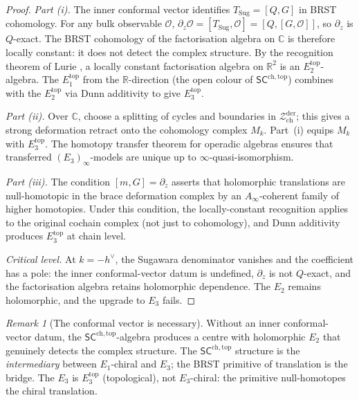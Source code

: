 \documentclass[11pt,reqno]{amsart}
\theoremstyle{definition}
\theoremstyle{remark}
\newtheorem{remark}[theorem]{Remark}
\providecommand{\cO}{\mathcal{O}}
\providecommand{\cZ}{\mathcal{Z}}
\providecommand{\Ainf}{A_\infty}
\providecommand{\Eone}{E_1}
\providecommand{\Etwo}{E_2}
\providecommand{\Ethree}{E_3}
\providecommand{\SCchtop}{\ensuremath{\mathsf{SC}^{\mathrm{ch,top}}}}
\providecommand{\bC}{\mathbb{C}}
\providecommand{\bR}{\mathbb{R}}
\begin{document}
\begin{proof}
\emph{Part (i).}
The inner conformal vector identifies $T_{\mathrm{Sug}} =
[Q, G]$ in BRST cohomology. For any bulk observable $\cO$,
$\partial_z\cO = [T_{\mathrm{Sug}}, \cO] = [Q, [G, \cO]]$,
so $\partial_z$ is $Q$-exact. The BRST cohomology of the
factorisation algebra on $\bC$ is therefore locally constant:
it does not detect the complex structure. By the recognition
theorem of Lurie \cite{HA}, a locally constant factorisation
algebra on $\bR^2$ is an $\Etwo^{\mathrm{top}}$-algebra.
The $\Eone^{\mathrm{top}}$ from the $\bR$-direction (the open
colour of $\SCchtop$) combines with the
$\Etwo^{\mathrm{top}}$ via Dunn additivity to give
$\Ethree^{\mathrm{top}}$.

\emph{Part (ii).}
Over $\bC$, choose a splitting of cycles and boundaries in
$\cZ^{\mathrm{der}}_{\mathrm{ch}}$; this gives a strong
deformation retract onto the cohomology complex $M_k$. Part~(i)
equips $M_k$ with $\Ethree^{\mathrm{top}}$. The homotopy
transfer theorem for operadic algebras ensures that transferred
$(E_3)_\infty$-models are unique up to
$\infty$-quasi-isomorphism.

\emph{Part (iii).}
The condition $[m, G] = \partial_z$ asserts that holomorphic
translations are null-homotopic in the brace deformation complex
by an $\Ainf$-coherent family of higher homotopies. Under this
condition, the locally-constant recognition applies to the
original cochain complex (not just to cohomology), and Dunn
additivity produces $\Ethree^{\mathrm{top}}$ at chain level.

\emph{Critical level.}
At $k = -h^\vee$, the Sugawara denominator vanishes and the
coefficient has a pole: the inner conformal-vector datum is undefined,
$\partial_z$ is not $Q$-exact,
and the factorisation algebra retains holomorphic dependence.
The $\Etwo$ remains holomorphic, and the upgrade to $\Ethree$
fails.
\end{proof}

\begin{remark}[The conformal vector is necessary]
\label{rem:e-conformal-necessary}
Without an inner conformal-vector datum, the $\SCchtop$-algebra produces a
centre with holomorphic $\Etwo$ that genuinely detects the
complex structure. The $\SCchtop$ structure is the
\emph{intermediary} between $\Eone$-chiral and $\Ethree$; the
BRST primitive of translation is the bridge. The $\Ethree$ is
$\Ethree^{\mathrm{top}}$ (topological), not
$\Ethree$-chiral: the primitive null-homotopes the chiral
translation.
\end{remark}
\end{document}
